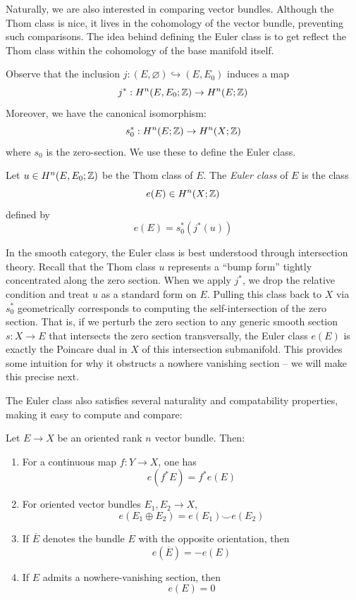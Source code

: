 \documentclass[12pt]{article}
\begin{document}
Naturally, we are also interested in comparing vector bundles. Although the Thom class is nice, it lives in the cohomology of the vector bundle, preventing such comparisons. The idea behind defining the Euler class is to get reflect the Thom class within the cohomology of the base manifold itself.

Observe that the inclusion $j:(E,\varnothing)\hookrightarrow (E,E_0)$ induces a map
\[ j^*:H^n(E,E_0;\mathbb Z)\to H^n(E;\mathbb Z) \]
Moreover, we have the canonical isomorphism:
\[ s_0^*: H^n(E;\mathbb Z) \to H^n(X; \mathbb Z)\]
where $s_0$ is the zero-section. We use these to define the Euler class.

\begin{definition}
Let $u\in H^n(E,E_0;\mathbb Z)$ be the Thom class of $E$. The \emph{Euler class} of $E$ is the class
\[ e(E) \in H^n(X;\mathbb Z) \]
defined by
\[ e(E) = s_0^*(j^*(u)) \]
\end{definition}

\begin{remark}
    In the smooth category, the Euler class is best understood through intersection theory. Recall that the Thom class $u$ represents a ``bump form'' tightly concentrated along the zero section. When we apply $j^*$, we drop the relative condition and treat $u$ as a standard form on $E$. Pulling this class back to $X$ via $s_0^*$ geometrically corresponds to computing the self-intersection of the zero section. That is, if we perturb the zero section to any generic smooth section $s: X \to E$ that intersects the zero section transversally, the Euler class $e(E)$ is exactly the Poincare dual in $X$ of this intersection submanifold. This provides some intuition for why it obstructs a nowhere vanishing section -- we will make this precise next. 
\end{remark}

The Euler class also satisfies several naturality and compatability properties, making it easy to compute and compare: 
\begin{theorem}
Let $E\to X$ be an oriented rank $n$ vector bundle. Then:
\begin{enumerate}
    \item For a continuous map $f:Y\to X$, one has
    \[  e(f^*E)=f^*e(E) \]
    \item For oriented vector bundles $E_1,E_2\to X$,
    \[ e(E_1\oplus E_2)=e(E_1)\smile e(E_2) \]
    \item If $\overline{E}$ denotes the bundle $E$ with the opposite orientation, then
    \[ e(\overline{E})=-e(E) \]
    \item If $E$ admits a nowhere-vanishing section, then
    \[ e(E)=0 \]
\end{enumerate}
\end{theorem}
\end{document}
